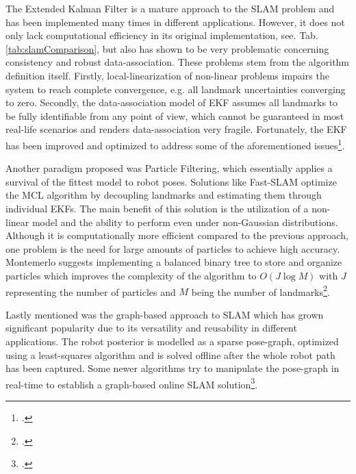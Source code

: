The Extended Kalman Filter is a mature approach to the SLAM problem and has been implemented many times in different applications. However, it does not only lack computational efficiency in its original implementation, see. Tab. \ref{tab:slamComparison}, but also has shown to be very problematic concerning consistency and robust data-association. 
These problems stem from the algorithm definition itself. Firstly, local-linearization of non-linear problems impairs the system to reach complete convergence, e.g. all landmark uncertainties converging to zero. Secondly, the data-association model of EKF assumes all landmarks to be fully identifiable from any point of view, which cannot be guaranteed in most real-life scenarios and renders data-association very fragile.
Fortunately, the EKF has been improved and optimized to address some of the aforementioned issues\footcite{bailey2006simultaneous}.

Another paradigm proposed was Particle Filtering, which essentially applies a survival of the fittest model to robot poses. Solutions like Fast-SLAM optimize the MCL algorithm by decoupling landmarks and estimating them through individual EKFs. 
The main benefit of this solution is the utilization of a non-linear model and the ability to perform even under non-Gaussian distributions. 
Although it is computationally more efficient compared to the previous approach, one problem is the need for large amounts of particles to achieve high accuracy. Montemerlo suggests implementing a balanced binary tree to store and organize particles which improves the complexity of the algorithm to $O(J  \log  M)$ with $J$ representing the number of particles and $M$ being the number of landmarks\footcite{montemerlo2002fastslam}.

Lastly mentioned was the graph-based approach to SLAM which has grown significant popularity due to its versatility and reusability in different applications. The robot posterior is modelled as a sparse pose-graph, optimized using a least-squares algorithm and is solved offline after the whole robot path has been captured. Some newer algorithms try to manipulate the pose-graph in real-time to establish a graph-based online SLAM solution\footcite{stachniss2016simultaneous}.


